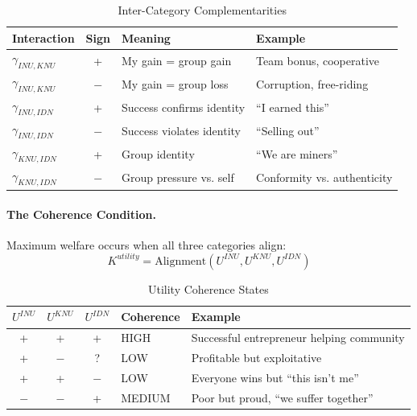 \begin{table}[htbp]
\centering
\caption{Inter-Category Complementarities}
\label{tab:complementarities}
\renewcommand{\arraystretch}{1.3}
\begin{tabular}{@{}lcll@{}}
\toprule
\textbf{Interaction} & \textbf{Sign} & \textbf{Meaning} & \textbf{Example} \\
\midrule
$\gamma_{INU,KNU}$ & + & My gain = group gain & Team bonus, cooperative \\
$\gamma_{INU,KNU}$ & $-$ & My gain = group loss & Corruption, free-riding \\
\addlinespace
$\gamma_{INU,IDN}$ & + & Success confirms identity & ``I earned this'' \\
$\gamma_{INU,IDN}$ & $-$ & Success violates identity & ``Selling out'' \\
\addlinespace
$\gamma_{KNU,IDN}$ & + & Group identity & ``We are miners'' \\
$\gamma_{KNU,IDN}$ & $-$ & Group pressure vs. self & Conformity vs. authenticity \\
\bottomrule
\end{tabular}
\end{table}

\paragraph{The Coherence Condition.}
Maximum welfare occurs when all three categories align:
\begin{equation}
K^{utility} = \text{Alignment}(U^{INU}, U^{KNU}, U^{IDN})
\end{equation}

\begin{table}[htbp]
\centering
\caption{Utility Coherence States}
\label{tab:utility-coherence}
\renewcommand{\arraystretch}{1.3}
\begin{tabular}{@{}cccll@{}}
\toprule
$U^{INU}$ & $U^{KNU}$ & $U^{IDN}$ & \textbf{Coherence} & \textbf{Example} \\
\midrule
+ & + & + & HIGH & Successful entrepreneur helping community \\
+ & $-$ & ? & LOW & Profitable but exploitative \\
+ & + & $-$ & LOW & Everyone wins but ``this isn't me'' \\
$-$ & $-$ & + & MEDIUM & Poor but proud, ``we suffer together'' \\
\bottomrule
\end{tabular}
\end{table}

